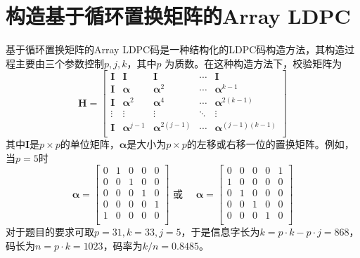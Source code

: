 \documentclass[lang=cn,11pt,a4paper,numbers]{elegantpaper}
\begin{document}
\section{构造基于循环置换矩阵的Array LDPC}
基于循环置换矩阵的Array LDPC码是一种结构化的LDPC码构造方法，其构造过程主要由三个参数控制$p, j, k$，其中$p$
为质数。在这种构造方法下，校验矩阵为
\begin{equation*}
\boldsymbol{H} = 
\begin{bmatrix} 
\boldsymbol{I} & \boldsymbol{I}            &\boldsymbol{I}        & \cdots & \boldsymbol{I} \\
\boldsymbol{I} & \boldsymbol{\alpha}       &\boldsymbol{\alpha}^2 & \cdots & \boldsymbol{\alpha}^{k-1} \\
\boldsymbol{I} & \boldsymbol{\alpha}^2     &\boldsymbol{\alpha}^4 & \cdots & \boldsymbol{\alpha}^{2(k-1)}\\
\vdots         & \vdots                    &\vdots                & \ddots & \vdots \\
\boldsymbol{I} & \boldsymbol{\alpha}^{j-1} &\boldsymbol{\alpha}^{2(j-1)}   & \cdots & \boldsymbol{\alpha}^{(j-1)(k-1)}\\
\end{bmatrix}
\end{equation*}
其中$\boldsymbol{I}$是$p\times p$的单位矩阵，$\boldsymbol{\alpha}$是大小为$p\times p$的左移或右移一位的置换矩阵。例如，当$p=5$时
\begin{equation}
    \boldsymbol{\alpha} = 
    \begin{bmatrix}
        0 & 1 & 0 & 0 & 0 \\
        0 & 0 & 1 & 0 & 0 \\
        0 & 0 & 0 & 1 & 0 \\
        0 & 0 & 0 & 0 & 1 \\
        1 & 0 & 0 & 0 & 0 \\
    \end{bmatrix}
    \text{ 或 }\quad
    \boldsymbol{\alpha} = 
    \begin{bmatrix}
        0 & 0 & 0 & 0 & 1\\
        1 & 0 & 0 & 0 & 0\\
        0 & 1 & 0 & 0 & 0\\
        0 & 0 & 1 & 0 & 0\\
        0 & 0 & 0 & 1 & 0\\
    \end{bmatrix}
\end{equation}
对于题目的要求可取$p=31, k=33, j = 5$，于是信息字长为$k = p\cdot k - p\cdot j = 868$，码长为$n = p \cdot k = 1023$，码率为$k/n=0.8485$。
\end{document}
